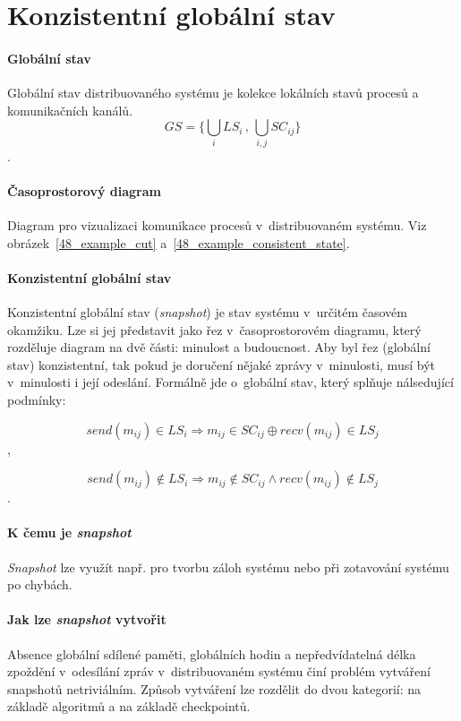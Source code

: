 \section{Konzistentní globální stav}

\paragraph*{Globální stav} Globální stav distribuovaného systému je kolekce lokálních stavů procesů a komunikačních kanálů. $$
GS = \Big\{ \bigcup_{i} LS_i \,,\, \bigcup_{i, j} SC_{ij} \Big\}
$$.

\paragraph*{Časoprostorový diagram} Diagram pro vizualizaci komunikace procesů v~distribuovaném systému. Viz obrázek~\ref{48_example_cut} a~\ref{48_example_consistent_state}.

\paragraph*{Konzistentní globální stav} Konzistentní globální stav (\textit{snapshot}) je stav systému v~určitém časovém okamžiku. Lze si jej představit jako řez v~časoprostorovém diagramu, který rozděluje diagram na dvě části: minulost a budoucnost. Aby byl řez (globální stav) konzistentní, tak pokud je doručení nějaké zprávy v~minulosti, musí být v~minulosti i její odeslání. Formálně jde o~globální stav, který splňuje nálsedující podmínky:

$$
send(m_{ij}) \in LS_i \Rightarrow m_{ij} \in SC_{ij} \oplus recv(m_{ij}) \in LS_j
$$,

$$
send(m_{ij}) \not\in LS_i \Rightarrow m_{ij} \not\in SC_{ij} \land recv(m_{ij}) \not\in LS_j
$$.

\paragraph*{K čemu je \textit{snapshot}} \textit{Snapshot} lze využít např. pro tvorbu záloh systému nebo při zotavování systému po chybách.

\paragraph*{Jak lze \textit{snapshot} vytvořit} Absence globální sdílené paměti, globálních hodin a nepředvídatelná délka zpoždění v~odesílání zpráv v~distribuovaném systému činí problém vytváření snapshotů netriviálním. Způsob vytváření lze rozdělit do dvou kategorií: na základě algoritmů a na základě checkpointů.

